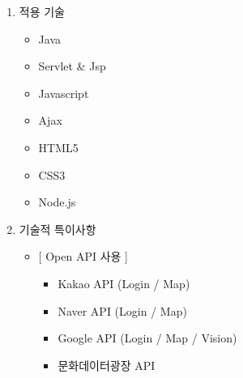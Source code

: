 \begin{enumerate}
\begin{itemize}
\begin{itemize}
                \end{itemize}
        \end{itemize}
    \item 적용 기술
        \begin{itemize}
            \item Java 
            \item Servlet \& Jsp 
            \item Javascript
            \item Ajax
            \item HTML5
            \item CSS3
            \item Node.js
        \end{itemize}

    \item 기술적 특이사항 
    \begin{itemize}
        \item{} [ Open API 사용 ]
            \begin{itemize}
                \item[] Kakao API (Login / Map)
                \item[] Naver API (Login / Map)
                \item[] Google API (Login / Map / Vision)
                \item[] 문화데이터광장 API
            \end{itemize}
    \end{itemize}
\end{enumerate}
\par\
\newpage


